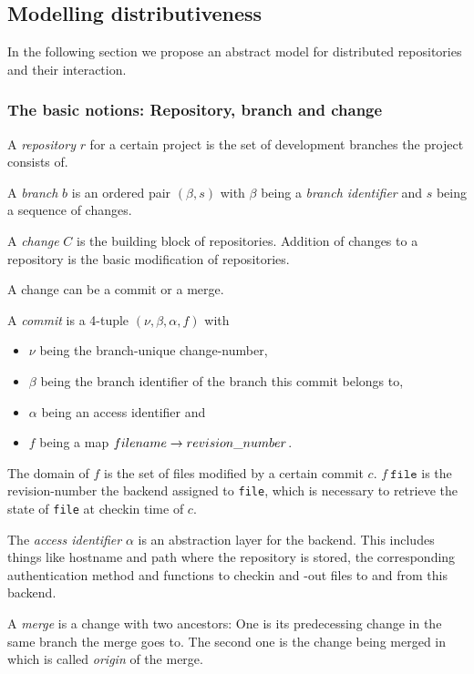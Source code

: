 \documentclass[fleqn, 10pt, a4paper]{report} \usepackage{amssymb}
\begin{document}
\subsection{Modelling distributiveness}

In the following section we propose an abstract model for distributed
repositories and their interaction.

\subsubsection{The basic notions: Repository, branch and change}

A \emph{repository} $r$ for a certain project is the set of
development branches the project consists of.

A \emph{branch} $b$ is an ordered pair $(\beta, s)$ with $\beta$ being
a \emph{branch identifier} and $s$ being a sequence of changes.

A \emph{change} $C$ is the building block of repositories.  Addition
of changes to a repository is the basic modification of repositories.

A change can be a commit or a merge.

A \emph{commit} is a 4-tuple $(\nu, \beta, \alpha, f)$ with
\begin{itemize}
\item $\nu$ being the branch-unique change-number,
\item $\beta$ being the branch identifier of the branch this commit
  belongs to,
\item $\alpha$ being an access identifier and
\item $f$ being a map $\mathnormal{filename} \rightarrow
  \mathnormal{revision\_number}$.
\end{itemize}

The domain of $f$ is the set of files modified by a certain commit
$c$. $f\ \mathtt{file}$ is the revision-number the backend assigned to
\texttt{file}, which is necessary to retrieve the state of
\texttt{file} at checkin time of $c$.

The \emph{access identifier} $\alpha$ is an abstraction layer for the
backend. This includes things like hostname and path where the
repository is stored, the corresponding authentication method and
functions to checkin and -out files to and from this backend.

A \emph{merge} is a change with two ancestors: One is its predecessing
change in the same branch the merge goes to. The second one is the
change being merged in which is called \emph{origin} of the merge.
\end{document}
